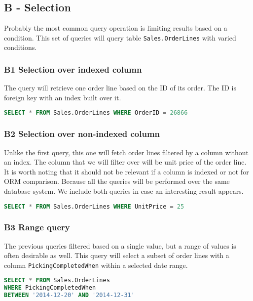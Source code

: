 \subsection{B - Selection}
Probably the most common query operation is limiting results based on a condition. This set of queries will query table \texttt{Sales.OrderLines} with varied conditions.

\subsubsection*{B1 Selection over indexed column}
The query will retrieve one order line based on the ID of its order. The ID is foreign key with an index built over it.

\begin{lstlisting}[language=SQL]
SELECT * FROM Sales.OrderLines WHERE OrderID = 26866
\end{lstlisting}

\subsubsection*{B2 Selection over non-indexed column}
Unlike the first query, this one will fetch order lines filtered by a column without an index. The column that we will filter over will be unit price of the order line.
It is worth noting that it should not be relevant if a column is indexed or not for ORM comparison. Because all the queries will be performed over the same database system. We include both queries in case an interesting result appears.

\begin{lstlisting}[language=SQL]
SELECT * FROM Sales.OrderLines WHERE UnitPrice = 25
\end{lstlisting}

\subsubsection*{B3 Range query}
The previous queries filtered based on a single value, but a range of values is often desirable as well.
This query will select a subset of order lines with a column \texttt{PickingCompletedWhen} within a selected date range.

\begin{lstlisting}[language=SQL]
SELECT * FROM Sales.OrderLines 
WHERE PickingCompletedWhen 
BETWEEN '2014-12-20' AND '2014-12-31'
\end{lstlisting}

